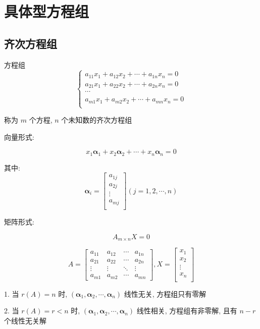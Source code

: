 \section{具体型方程组}
\subsection{齐次方程组}
\begin{definition}[齐次方程组]

	方程组
	$$\begin{cases}
		a_{11}x_{1}+a_{12}x_{2}+\cdots+a_{1n}x_{n}=0\\
		a_{21}x_{1}+a_{22}x_{2}+\cdots+a_{2n}x_{n}=0\\
		\cdots\\
		a_{m1}x_{1}+a_{m2}x_{2}+\cdots+a_{mn}x_{n}=0\\
	\end{cases}$$

	称为 $m$ 个方程, $n$ 个未知数的齐次方程组
	
	向量形式:  
	
	$$x_{1}\boldsymbol{\alpha}_{1}+x_{2}\boldsymbol{\alpha}_{2}+\cdots+x_{n}\boldsymbol{\alpha}_{n}=0$$
	
	其中:  
	$$\boldsymbol{\alpha}_{i} = \begin{bmatrix}
		a_{1j}\\
		a_{2j}\\
		\vdots\\
		a_{mj}\\
	\end{bmatrix} (j = 1,2,\cdots,n)$$
	
	矩阵形式:  
	
	$$A_{m\times n}X=0$$
	
	$$A = 
	\begin{bmatrix}
		a_{11} & a_{12} & \cdots & a_{1n}\\
		a_{21} & a_{22} & \cdots & a_{2n}\\
		\vdots & \vdots & \ddots & \vdots\\
		a_{m1} & a_{m2} & \cdots & a_{mn}
	\end{bmatrix}, 
	X = \begin{bmatrix}
		x_{1}\\
		x_{2}\\
		\vdots\\
		x_{n}\\
	\end{bmatrix}$$
\end{definition}

\begin{theorem}
	1. 当 $r(A) = n$ 时, $(\boldsymbol{\alpha}_{1},\boldsymbol{\alpha}_{2},\cdots,\boldsymbol{\alpha}_{n})$ 线性无关, 方程组只有零解
	
	2. 当 $r(A) = r < n$ 时, $(\boldsymbol{\alpha}_{1},\boldsymbol{\alpha}_{2},\cdots,\boldsymbol{\alpha}_{n})$ 线性相关, 方程组有非零解, 且有 $n-r$ 个线性无关解
\end{theorem}

